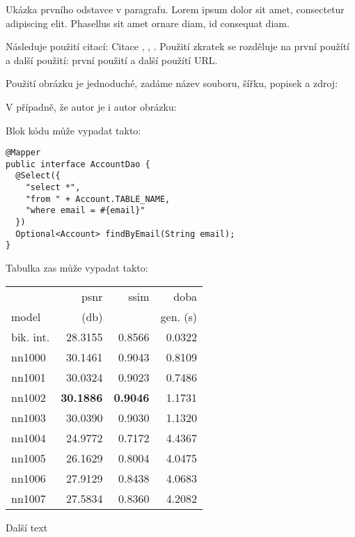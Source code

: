 
			\noindent Ukázka prvního odstavce v paragrafu. Lorem ipsum dolor sit amet, consectetur adipiscing elit. Phasellus sit amet ornare diam, id consequat diam.

			Následuje použití citací: Citace \cite{html_hypertext_markup_language}, \cite{hibernate_docs}, \cite{ddd_quickly}.
			Použití zkratek se rozděluje na první použítí a další použití: první použití  a další použítí \ac{URL}.

			Použití obrázku je jednoduché, zadáme název souboru, šířku, popisek a zdroj:


			V případně, že autor je i autor obrázku:


			Blok kódu může vypadat takto:

			\begin{codeblock}
				\begin{verbatim}
@Mapper
public interface AccountDao {
  @Select({
    "select *",
    "from " + Account.TABLE_NAME,
    "where email = #{email}"
  })
  Optional<Account> findByEmail(String email);
}
				\end{verbatim}
			\end{codeblock}

			Tabulka zas může vypadat takto:

			\begin{table}[hbt!]
				\centering
				\begin{tabular}{| l | r | r | r | }
					\hline
					&        psnr &      ssim &      doba  \\
					model &       (db)    &           & gen. (s) \\
					\hline
					bik. int. & 28.3155 & 0.8566 & 0.0322 \\
					nn1000    & 30.1461 & 0.9043 & 0.8109 \\
					nn1001    & 30.0324 & 0.9023 & 0.7486 \\
					nn1002    & \textbf{30.1886} & \textbf{0.9046} & 1.1731 \\
					nn1003    & 30.0390 & 0.9030 & 1.1320 \\
					nn1004    & 24.9772 & 0.7172 & 4.4367 \\
					nn1005    & 26.1629 & 0.8004 & 4.0475 \\
					nn1006    & 27.9129 & 0.8438 & 4.0683 \\
					nn1007    & 27.5834 & 0.8360 & 4.2082 \\
					\hline
				\end{tabular}
			\end{table}

			\newpage

			Další text


